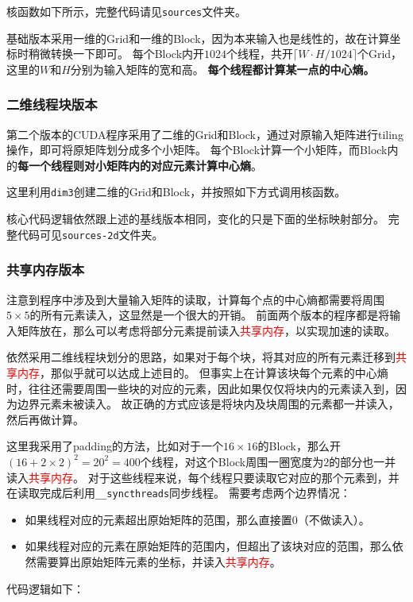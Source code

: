 \documentclass[logo,reportComp]{thesis}
\def\globalmem{\textcolor{black}{\kaiti 全局内存}}
\def\sharedmem{\textcolor{red}{\kaiti 共享内存}}
\begin{document}
核函数如下所示，完整代码请见\verb'sources'文件夹。


基础版本采用一维的Grid和一维的Block，因为本来输入也是线性的，故在计算坐标时稍微转换一下即可。
每个Block内开$1024$个线程，共开$\lceil W\cdot H/1024\rceil$个Grid，这里的$W$和$H$分别为输入矩阵的宽和高。
\textbf{每个线程都计算某一点的中心熵。}


\subsubsection{二维线程块版本}
第二个版本的CUDA程序采用了二维的Grid和Block，通过对原输入矩阵进行tiling操作，即可将原矩阵划分成多个小矩阵。
每个Block计算一个小矩阵，而Block内的\textbf{每一个线程则对小矩阵内的对应元素计算中心熵}。

这里利用\verb'dim3'创建二维的Grid和Block，并按照如下方式调用核函数。


核心代码逻辑依然跟上述的基线版本相同，变化的只是下面的坐标映射部分。
完整代码可见\verb'sources-2d'文件夹。


\subsubsection{共享内存版本}
注意到程序中涉及到大量输入矩阵的读取，计算每个点的中心熵都需要将周围$5\times 5$的所有元素读入，这显然是一个很大的开销。
前面两个版本的程序都是将输入矩阵放在，那么可以考虑将部分元素提前读入\sharedmem，以实现加速的读取。

依然采用二维线程块划分的思路，如果对于每个块，将其对应的所有元素迁移到\sharedmem，那似乎就可以达成上述目的。
但事实上在计算该块每个元素的中心熵时，往往还需要周围一些块的对应的元素，因此如果仅仅将块内的元素读入到，因为边界元素未被读入。
故正确的方式应该是将块内及块周围的元素都一并读入，然后再做计算。

这里我采用了padding的方法，比如对于一个$16\times 16$的Block，那么开$(16+2\times 2)^2=20^2=400$个线程，对这个Block周围一圈宽度为$2$的部分也一并读入\sharedmem。
对于这些线程来说，每个线程只要读取它对应的那个元素到，并在读取完成后利用\verb'__syncthreads'同步线程。
需要考虑两个边界情况：
\begin{itemize}
	\item 如果线程对应的元素超出原始矩阵的范围，那么直接置$0$（不做读入）。
	\item 如果线程对应的元素在原始矩阵的范围内，但超出了该块对应的范围，那么依然需要算出原始矩阵元素的坐标，并读入\sharedmem。
\end{itemize}
代码逻辑如下：

\end{document}
